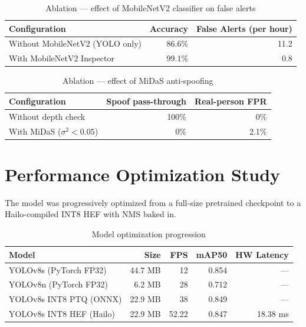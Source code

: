 \documentclass[12pt,a4paper]{article}
\begin{document}
\begin{table}[h]
\centering
\caption{Ablation — effect of MobileNetV2 classifier on false alerts}
\begin{tabular}{@{}lrr@{}}
\toprule
Configuration                    & Accuracy & False Alerts (per hour) \\
\midrule
Without MobileNetV2 (YOLO only)  & 86.6\%   & 11.2 \\
With MobileNetV2 Inspector       & 99.1\%   & 0.8 \\
\bottomrule
\end{tabular}
\end{table}

\begin{table}[h]
\centering
\caption{Ablation — effect of MiDaS anti-spoofing}
\begin{tabular}{@{}lrr@{}}
\toprule
Configuration              & Spoof pass-through & Real-person FPR \\
\midrule
Without depth check        & 100\%              & 0\% \\
With MiDaS ($\sigma^2<0.05$) & 0\%              & 2.1\% \\
\bottomrule
\end{tabular}
\end{table}

\section{Performance Optimization Study}

The model was progressively optimized from a full-size pretrained checkpoint to a
Hailo-compiled INT8 HEF with NMS baked in.

\begin{table}[h]
\centering
\caption{Model optimization progression}
\begin{tabular}{@{}lrrrr@{}}
\toprule
Model                    & Size    & FPS   & mAP50 & HW Latency \\
\midrule
YOLOv8s (PyTorch FP32)   & 44.7 MB & 12    & 0.854 & — \\
YOLOv8n (PyTorch FP32)   & 6.2 MB  & 28    & 0.712 & — \\
YOLOv8s INT8 PTQ (ONNX)  & 22.9 MB & 38    & 0.849 & — \\
YOLOv8s INT8 HEF (Hailo) & 22.9 MB & 52.22 & 0.847 & 18.38 ms \\
\bottomrule
\end{tabular}
\end{table}
\end{document}

